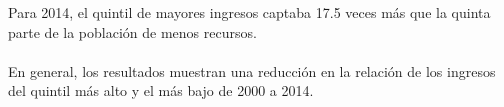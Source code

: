  Para 2014, el quintil de mayores ingresos captaba 17.5 veces más que la quinta parte de la población de menos recursos.\\\\ En general, los resultados muestran una reducción en la relación de los ingresos del quintil más alto y el más bajo de 2000 a 2014. 
